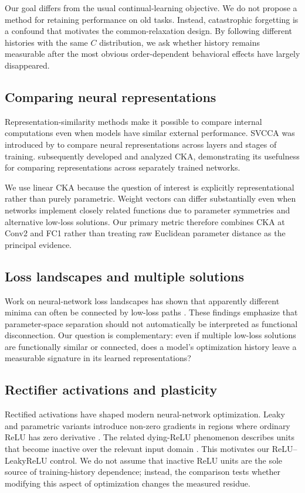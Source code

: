 \documentclass[11pt,a4paper]{article}
\begin{document}
Our goal differs from the usual continual-learning objective. We do not propose a method for retaining performance on old tasks. Instead, catastrophic forgetting is a confound that motivates the common-relaxation design. By following different histories with the same $C$ distribution, we ask whether history remains measurable after the most obvious order-dependent behavioral effects have largely disappeared.

\subsection{Comparing neural representations}
Representation-similarity methods make it possible to compare internal computations even when models have similar external performance. SVCCA was introduced by \citet{raghu2017svcca} to compare neural representations across layers and stages of training. \citet{kornblith2019similarity} subsequently developed and analyzed CKA, demonstrating its usefulness for comparing representations across separately trained networks.

We use linear CKA because the question of interest is explicitly representational rather than purely parametric. Weight vectors can differ substantially even when networks implement closely related functions due to parameter symmetries and alternative low-loss solutions. Our primary metric therefore combines CKA at Conv2 and FC1 rather than treating raw Euclidean parameter distance as the principal evidence.

\subsection{Loss landscapes and multiple solutions}
Work on neural-network loss landscapes has shown that apparently different minima can often be connected by low-loss paths \citep{draxler2018barriers,garipov2018loss}. These findings emphasize that parameter-space separation should not automatically be interpreted as functional disconnection. Our question is complementary: even if multiple low-loss solutions are functionally similar or connected, does a model's optimization history leave a measurable signature in its learned representations?

\subsection{Rectifier activations and plasticity}
Rectified activations have shaped modern neural-network optimization. Leaky and parametric variants introduce non-zero gradients in regions where ordinary ReLU has zero derivative \citep{maas2013rectifier,he2015rectifiers}. The related dying-ReLU phenomenon describes units that become inactive over the relevant input domain \citep{lu2019dying}. This motivates our ReLU--LeakyReLU control. We do not assume that inactive ReLU units are the sole source of training-history dependence; instead, the comparison tests whether modifying this aspect of optimization changes the measured residue.
\end{document}

